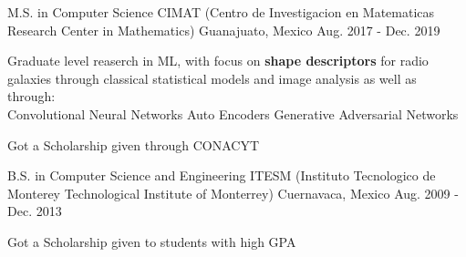 

\begin{cventries}


\cventry
    {M.S. in Computer Science} %
    {CIMAT (Centro de Investigacion en Matematicas {\enskip\cdotp\enskip} Research Center in Mathematics)} %
    {Guanajuato, Mexico} %
    {Aug. 2017 - Dec. 2019} %
    {
    \begin{cvitems} %
        \item {Graduate level reaserch in ML, with focus on \textbf{shape descriptors} for radio galaxies through classical statistical models and image analysis as well as through:\\
        {\enskip\cdotp\enskip} Convolutional Neural Networks
        {\enskip\cdotp\enskip} Auto Encoders
        {\enskip\cdotp\enskip} Generative Adversarial Networks}
        \item {Got a Scholarship given through CONACYT}
    \end{cvitems}
    }
  \cventry
    {B.S. in Computer Science and Engineering} %
    {ITESM ({Instituto Tecnologico de Monterey\enskip\cdotp\enskip} Technological Institute of Monterrey)} %
    {Cuernavaca, Mexico} %
    {Aug. 2009 - Dec. 2013} %
    {
      \begin{cvitems} %
        \item {Got a Scholarship given to students with high GPA}
      \end{cvitems}
    }

\end{cventries}

